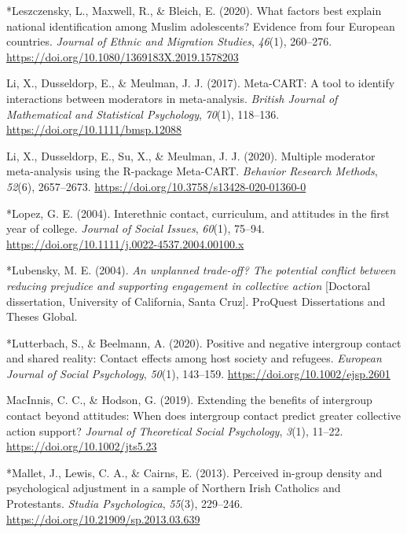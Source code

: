 \documentclass[12pt, letterpaper]{article}
\begin{document}
\leavevmode\hypertarget{ref-3134}{}%
*Leszczensky, L., Maxwell, R., \& Bleich, E. (2020). What factors best
explain national identification among Muslim adolescents? Evidence from
four European countries. \emph{Journal of Ethnic and Migration Studies},
\emph{46}(1), 260--276.
\url{https://doi.org/10.1080/1369183X.2019.1578203}

\leavevmode\hypertarget{ref-li_meta-cart_2017}{}%
Li, X., Dusseldorp, E., \& Meulman, J. J. (2017). Meta-CART: A tool to
identify interactions between moderators in meta-analysis. \emph{British
Journal of Mathematical and Statistical Psychology}, \emph{70}(1),
118--136. \url{https://doi.org/10.1111/bmsp.12088}

\leavevmode\hypertarget{ref-li_multiple_2020}{}%
Li, X., Dusseldorp, E., Su, X., \& Meulman, J. J. (2020). Multiple
moderator meta-analysis using the R-package Meta-CART. \emph{Behavior
Research Methods}, \emph{52}(6), 2657--2673.
\url{https://doi.org/10.3758/s13428-020-01360-0}

\leavevmode\hypertarget{ref-1042}{}%
*Lopez, G. E. (2004). Interethnic contact, curriculum, and attitudes in
the first year of college. \emph{Journal of Social Issues},
\emph{60}(1), 75--94.
\url{https://doi.org/10.1111/j.0022-4537.2004.00100.x}

\leavevmode\hypertarget{ref-894}{}%
*Lubensky, M. E. (2004). \emph{An unplanned trade-off? The potential
conflict between reducing prejudice and supporting engagement in
collective action} {[}Doctoral dissertation, University of California,
Santa Cruz{]}. ProQuest Dissertations and Theses Global.

\leavevmode\hypertarget{ref-4000}{}%
*Lutterbach, S., \& Beelmann, A. (2020). Positive and negative
intergroup contact and shared reality: Contact effects among host
society and refugees. \emph{European Journal of Social Psychology},
\emph{50}(1), 143--159. \url{https://doi.org/10.1002/ejsp.2601}

\leavevmode\hypertarget{ref-macinnis_extending_2019}{}%
MacInnis, C. C., \& Hodson, G. (2019). Extending the benefits of
intergroup contact beyond attitudes: When does intergroup contact
predict greater collective action support? \emph{Journal of Theoretical
Social Psychology}, \emph{3}(1), 11--22.
\url{https://doi.org/10.1002/jts5.23}

\leavevmode\hypertarget{ref-893}{}%
*Mallet, J., Lewis, C. A., \& Cairns, E. (2013). Perceived in-group
density and psychological adjustment in a sample of Northern Irish
Catholics and Protestants. \emph{Studia Psychologica}, \emph{55}(3),
229--246. \url{https://doi.org/10.21909/sp.2013.03.639}
\end{document}
